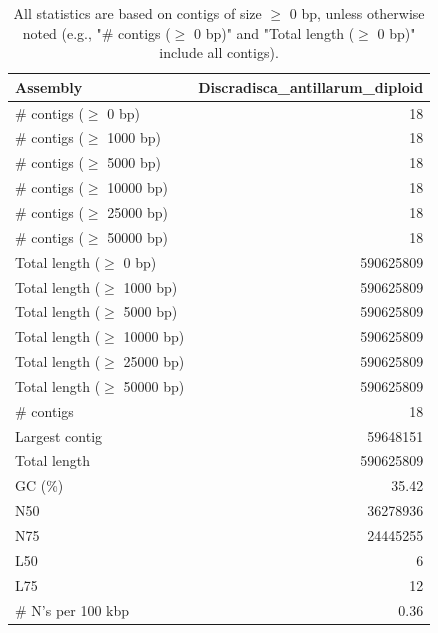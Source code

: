 \documentclass[12pt,a4paper]{article}
\begin{document}
\begin{table}[ht]
\begin{center}
\caption{All statistics are based on contigs of size $\geq$ 0 bp, unless otherwise noted (e.g., "\# contigs ($\geq$ 0 bp)" and "Total length ($\geq$ 0 bp)" include all contigs).}
\begin{tabular}{|l*{1}{|r}|}
\hline
Assembly & Discradisca\_antillarum\_diploid \\ \hline
\# contigs ($\geq$ 0 bp) & 18 \\ \hline
\# contigs ($\geq$ 1000 bp) & 18 \\ \hline
\# contigs ($\geq$ 5000 bp) & 18 \\ \hline
\# contigs ($\geq$ 10000 bp) & 18 \\ \hline
\# contigs ($\geq$ 25000 bp) & 18 \\ \hline
\# contigs ($\geq$ 50000 bp) & 18 \\ \hline
Total length ($\geq$ 0 bp) & 590625809 \\ \hline
Total length ($\geq$ 1000 bp) & 590625809 \\ \hline
Total length ($\geq$ 5000 bp) & 590625809 \\ \hline
Total length ($\geq$ 10000 bp) & 590625809 \\ \hline
Total length ($\geq$ 25000 bp) & 590625809 \\ \hline
Total length ($\geq$ 50000 bp) & 590625809 \\ \hline
\# contigs & 18 \\ \hline
Largest contig & 59648151 \\ \hline
Total length & 590625809 \\ \hline
GC (\%) & 35.42 \\ \hline
N50 & 36278936 \\ \hline
N75 & 24445255 \\ \hline
L50 & 6 \\ \hline
L75 & 12 \\ \hline
\# N's per 100 kbp & 0.36 \\ \hline
\end{tabular}
\end{center}
\end{table}
\end{document}
